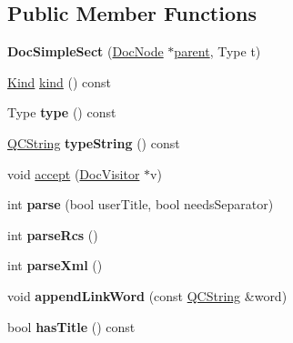 \subsection*{Public Member Functions}
\begin{DoxyCompactItemize}
\item 
\mbox{\label{class_doc_simple_sect_a0ef58433b1e5f366b593d17a9ba4b9e1}} 
{\bfseries Doc\+Simple\+Sect} (\mbox{\hyperlink{class_doc_node}{Doc\+Node}} $\ast$\mbox{\hyperlink{class_doc_node_a73e8ad29a91cfceb0968eb00db71a23d}{parent}}, Type t)
\item 
\mbox{\hyperlink{class_doc_node_aebd16e89ca590d84cbd40543ea5faadb}{Kind}} \mbox{\hyperlink{class_doc_simple_sect_a9a9f612d6101d0accc815394e5d29e34}{kind}} () const
\item 
\mbox{\label{class_doc_simple_sect_a1ea4e7672816ad91cf567b2000f1a65c}} 
Type {\bfseries type} () const
\item 
\mbox{\label{class_doc_simple_sect_a151d09b73379f0fcade95af7ce910250}} 
\mbox{\hyperlink{class_q_c_string}{Q\+C\+String}} {\bfseries type\+String} () const
\item 
void \mbox{\hyperlink{class_doc_simple_sect_a83c0f2c289b0d15403d1adf94c98982d}{accept}} (\mbox{\hyperlink{class_doc_visitor}{Doc\+Visitor}} $\ast$v)
\item 
\mbox{\label{class_doc_simple_sect_a6d4285005170976f90f3aa926a7be8c0}} 
int {\bfseries parse} (bool user\+Title, bool needs\+Separator)
\item 
\mbox{\label{class_doc_simple_sect_a781284e66505901d40fd6d9df8663b3e}} 
int {\bfseries parse\+Rcs} ()
\item 
\mbox{\label{class_doc_simple_sect_a5cdcf0db314a3f9721842c3134550ce2}} 
int {\bfseries parse\+Xml} ()
\item 
\mbox{\label{class_doc_simple_sect_ae538f74c2d44222c9a45ef304c89e041}} 
void {\bfseries append\+Link\+Word} (const \mbox{\hyperlink{class_q_c_string}{Q\+C\+String}} \&word)
\item 
\mbox{\label{class_doc_simple_sect_af7bb6fa3996348dc1e211e32eb358f83}} 
bool {\bfseries has\+Title} () const
\end{DoxyCompactItemize}
